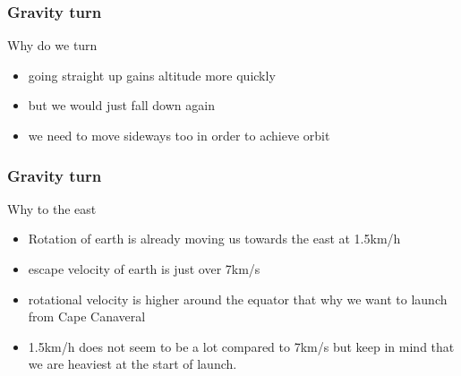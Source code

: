 {
%
\begin{frame}
\end{frame}
\begin{frame}
    \frametitle{Gravity turn}
    \begin{block}{Why do we turn}
        \begin{itemize}
            \item going straight up gains altitude more quickly
            \item but we would just fall down again
            \item we need to move sideways too in order to achieve orbit
        \end{itemize}
    \end{block}
\end{frame}
\begin{frame}
    \frametitle{Gravity turn}
    \begin{block}{Why to the east}
        \begin{itemize}
            \item Rotation of earth is already moving us towards the east at 1.5km/h
            \item escape velocity of earth is just over 7km/s
            \item rotational velocity is higher around the equator that why we want to launch from Cape Canaveral
            \item 1.5km/h does not seem to be a lot compared to 7km/s but keep in mind that we are heaviest at the start of launch.
        \end{itemize}
    \end{block}

\end{frame}}
